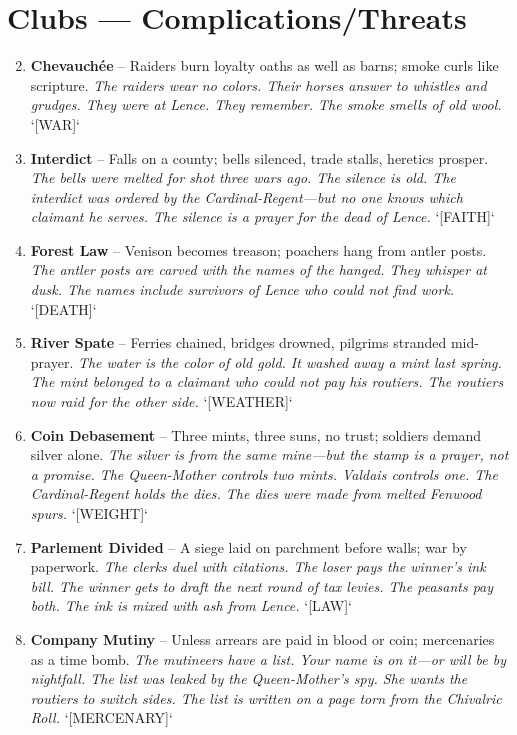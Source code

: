 \section*{Clubs --- Complications/Threats}
\label{sec:vhasia-complications}
\begin{enumerate}
\setcounter{enumi}{1}
\item \textbf{Chevauchée} -- Raiders burn loyalty oaths as well as barns; smoke curls like scripture.
  \hfill \textit{The raiders wear no colors. Their horses answer to whistles and grudges. They were at Lence. They remember. The smoke smells of old wool.} `[WAR]`
\item \textbf{Interdict} -- Falls on a county; bells silenced, trade stalls, heretics prosper.
  \hfill \textit{The bells were melted for shot three wars ago. The silence is old. The interdict was ordered by the Cardinal-Regent---but no one knows which claimant he serves. The silence is a prayer for the dead of Lence.} `[FAITH]`
\item \textbf{Forest Law} -- Venison becomes treason; poachers hang from antler posts.
  \hfill \textit{The antler posts are carved with the names of the hanged. They whisper at dusk. The names include survivors of Lence who could not find work.} `[DEATH]`
\item \textbf{River Spate} -- Ferries chained, bridges drowned, pilgrims stranded mid-prayer.
  \hfill \textit{The water is the color of old gold. It washed away a mint last spring. The mint belonged to a claimant who could not pay his routiers. The routiers now raid for the other side.} `[WEATHER]`
\item \textbf{Coin Debasement} -- Three mints, three suns, no trust; soldiers demand silver alone.
  \hfill \textit{The silver is from the same mine---but the stamp is a prayer, not a promise. The Queen-Mother controls two mints. Valdais controls one. The Cardinal-Regent holds the dies. The dies were made from melted Fenwood spurs.} `[WEIGHT]`
\item \textbf{Parlement Divided} -- A siege laid on parchment before walls; war by paperwork.
  \hfill \textit{The clerks duel with citations. The loser pays the winner's ink bill. The winner gets to draft the next round of tax levies. The peasants pay both. The ink is mixed with ash from Lence.} `[LAW]`
\item \textbf{Company Mutiny} -- Unless arrears are paid in blood or coin; mercenaries as a time bomb.
  \hfill \textit{The mutineers have a list. Your name is on it---or will be by nightfall. The list was leaked by the Queen-Mother's spy. She wants the routiers to switch sides. The list is written on a page torn from the Chivalric Roll.} `[MERCENARY]`

\end{enumerate}
